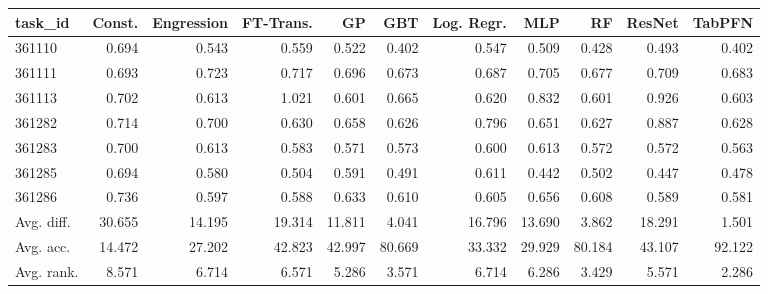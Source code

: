 \begin{tabular}{lrrrrrrrrrr}
\toprule
task\_id & Const. & Engression & FT-Trans. & GP & GBT & Log. Regr. & MLP & RF & ResNet & TabPFN \\
\midrule
361110 & 0.694 & 0.543 & 0.559 & 0.522 & 0.402 & 0.547 & 0.509 & 0.428 & 0.493 & 0.402 \\
361111 & 0.693 & 0.723 & 0.717 & 0.696 & 0.673 & 0.687 & 0.705 & 0.677 & 0.709 & 0.683 \\
361113 & 0.702 & 0.613 & 1.021 & 0.601 & 0.665 & 0.620 & 0.832 & 0.601 & 0.926 & 0.603 \\
361282 & 0.714 & 0.700 & 0.630 & 0.658 & 0.626 & 0.796 & 0.651 & 0.627 & 0.887 & 0.628 \\
361283 & 0.700 & 0.613 & 0.583 & 0.571 & 0.573 & 0.600 & 0.613 & 0.572 & 0.572 & 0.563 \\
361285 & 0.694 & 0.580 & 0.504 & 0.591 & 0.491 & 0.611 & 0.442 & 0.502 & 0.447 & 0.478 \\
361286 & 0.736 & 0.597 & 0.588 & 0.633 & 0.610 & 0.605 & 0.656 & 0.608 & 0.589 & 0.581 \\
Avg. diff. & 30.655 & 14.195 & 19.314 & 11.811 & 4.041 & 16.796 & 13.690 & 3.862 & 18.291 & 1.501 \\
Avg. acc. & 14.472 & 27.202 & 42.823 & 42.997 & 80.669 & 33.332 & 29.929 & 80.184 & 43.107 & 92.122 \\
Avg. rank. & 8.571 & 6.714 & 6.571 & 5.286 & 3.571 & 6.714 & 6.286 & 3.429 & 5.571 & 2.286 \\
\bottomrule
\end{tabular}
